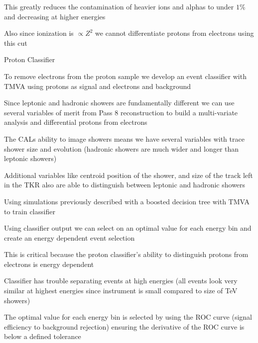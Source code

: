 \documentclass{article}
\begin{document}
\begin{myEnumerate}
\begin{myEnumerate}
\begin{myEnumerate}
\begin{myEnumerate}
					\end{myEnumerate}
					\item This greatly reduces the contamination of heavier ions and alphas to under $1\%$ and decreasing at higher energies
					\item Also since ionization is $\propto Z^2$ we cannot differentiate protons from electrons using this cut
				\end{myEnumerate}
				\item Proton Classifier
				\begin{myEnumerate}
					\item To remove electrons from the proton sample we develop an event classifier with TMVA using protons as signal and electrons and background
					\item Since leptonic and hadronic showers are fundamentally different we can use several variables of merit from Pass 8 reconstruction to build a multi-variate analysis and differential protons from electrons
					\begin{myEnumerate}
						\item The CALs ability to image showers means we have several variables with trace shower size and evolution (hadronic showers are much wider and longer than leptonic showers)
						\item Additional variables like centroid position of the shower, and size of the track left in the TKR also are able to distinguish between leptonic and hadronic showers
					\end{myEnumerate}
					\item Using simulations previously described with a boosted decision tree with TMVA to train classifier
					\item Using classifier output we can select on an optimal value for each energy bin and create an energy dependent event selection
					\begin{myEnumerate}
						\item This is critical because the proton classifier's ability to distinguish protons from electrons is energy dependent
						\item Classifier has trouble separating events at high energies (all events look very similar at highest energies since instrument is small compared to size of TeV showers)
					\end{myEnumerate}
					\item The optimal value for each energy bin is selected by using the ROC curve (signal efficiency to background rejection) ensuring the derivative of the ROC curve is below a defined tolerance

\end{myEnumerate}
\end{myEnumerate}
\end{myEnumerate}
\end{document}

